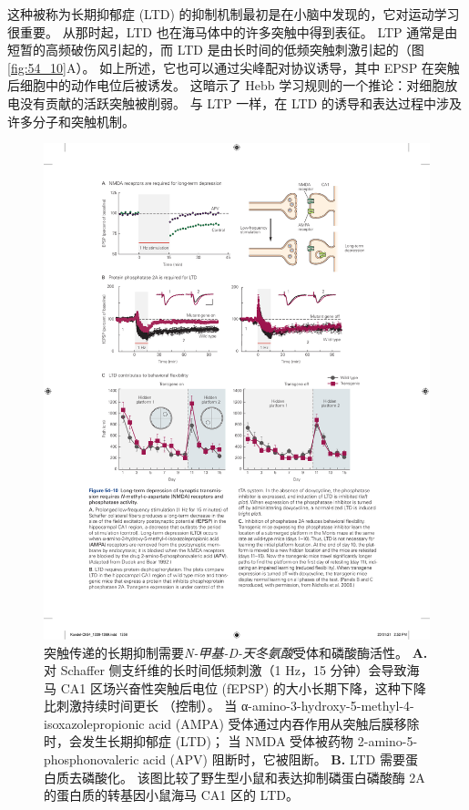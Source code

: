 这种被称为长期抑郁症 (LTD) 的抑制机制最初是在小脑中发现的，它对运动学习很重要。
从那时起，LTD 也在海马体中的许多突触中得到表征。 LTP 通常是由短暂的高频破伤风引起的，而 LTD 是由长时间的低频突触刺激引起的（图 \ref{fig:54_10}A）。
如上所述，它也可以通过尖峰配对协议诱导，其中 EPSP 在突触后细胞中的动作电位后被诱发。
这暗示了 Hebb 学习规则的一个推论：对细胞放电没有贡献的活跃突触被削弱。
与 LTP 一样，在 LTD 的诱导和表达过程中涉及许多分子和突触机制。


\begin{figure}[htbp]
	\centering
	\includegraphics[width=0.95\linewidth]{chap54/fig_54_10}
	\caption{突触传递的长期抑制需要\textit{N-甲基-D-天冬氨酸}受体和磷酸酶活性。
		\textbf{A.} 对 Schaffer 侧支纤维的长时间低频刺激（1 Hz，15 分钟）会导致海马 CA1 区场兴奋性突触后电位 (fEPSP) 的大小长期下降，这种下降比刺激持续时间更长 （控制）。
		当 α-amino-3-hydroxy-5-methyl-4-isoxazolepropionic acid (AMPA) 受体通过内吞作用从突触后膜移除时，会发生长期抑郁症 (LTD)；
		当 NMDA 受体被药物 2-amino-5-phosphonovaleric acid (APV) 阻断时，它被阻断\cite{dudek1992homosynaptic}。
		\textbf{B.} LTD 需要蛋白质去磷酸化。
		该图比较了野生型小鼠和表达抑制磷蛋白磷酸酶 2A 的蛋白质的转基因小鼠海马 CA1 区的 LTD。
}
\end{figure}
